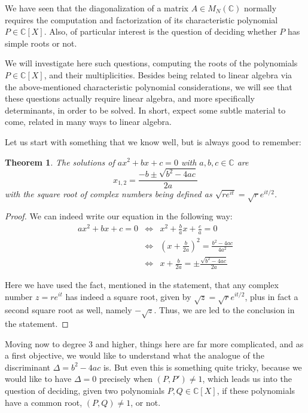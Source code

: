 \documentclass[12pt]{amsbook}
\newtheorem{theorem}{Theorem}[chapter]
\begin{document}
We have seen that the diagonalization of a matrix $A\in M_N(\mathbb C)$ normally requires the computation and factorization of its characteristic polynomial $P\in\mathbb C[X]$. Also, of particular interest is the question of deciding whether $P$ has simple roots or not. 

\bigskip

We will investigate here such questions, computing the roots of the polynomials $P\in\mathbb C[X]$, and their multiplicities. Besides being related to linear algebra via the above-mentioned characteristic polynomial considerations, we will see that these questions actually require linear algebra, and more specifically determinants, in order to be solved. In short, expect some subtle material to come, related in many ways to linear algebra.  

\bigskip

Let us start with something that we know well, but is always good to remember:


\begin{theorem}
The solutions of $ax^2+bx+c=0$ with $a,b,c\in\mathbb C$ are
$$x_{1,2}=\frac{-b\pm\sqrt{b^2-4ac}}{2a}$$
with the square root of complex numbers being defined as $\sqrt{re^{it}}=\sqrt{r}e^{it/2}$.
\end{theorem}

\begin{proof}
We can indeed write our equation in the following way:
\begin{eqnarray*}
ax^2+bx+c=0
&\iff&x^2+\frac{b}{a}x+\frac{c}{a}=0\\
&\iff&\left(x+\frac{b}{2a}\right)^2=\frac{b^2-4ac}{4a^2}\\
&\iff&x+\frac{b}{2a}=\pm\frac{\sqrt{b^2-4ac}}{2a}
\end{eqnarray*}

Here we have used the fact, mentioned in the statement, that any complex number $z=re^{it}$ has indeed a square root, given by $\sqrt{z}=\sqrt{r}e^{it/2}$, plus in fact a second square root as well, namely $-\sqrt{z}$. Thus, we are led to the conclusion in the statement.
\end{proof}

Moving now to degree 3 and higher, things here are far more complicated, and as a first objective, we would like to understand what the analogue of the discriminant $\Delta=b^2-4ac$ is. But even this is something quite tricky, because we would like to have $\Delta=0$ precisely when $(P,P')\neq1$, which leads us into the question of deciding, given two polynomials $P,Q\in\mathbb C[X]$, if these polynomials have a common root, $(P,Q)\neq1$, or not. 
\end{document}

